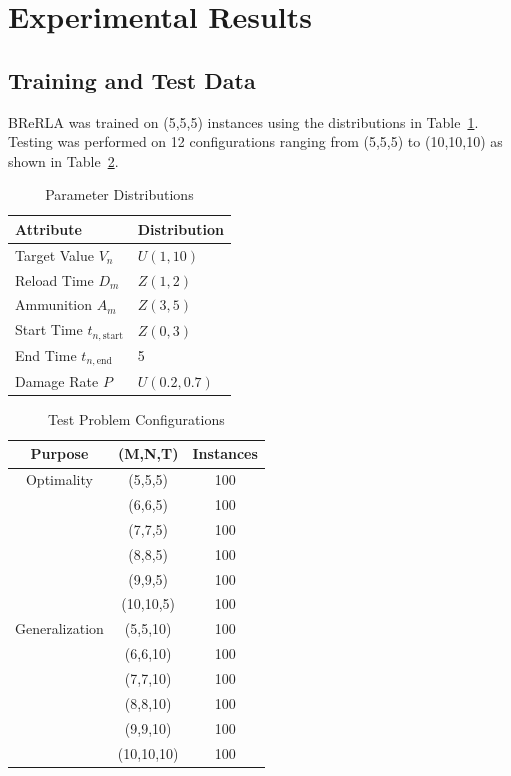 \documentclass{ieeeaccess}
\begin{document}
\section{Experimental Results}
\label{sec:results}

\subsection{Training and Test Data}

BReRLA was trained on (5,5,5) instances using the distributions in Table~\ref{tab:parameter_distributions}. Testing was performed on 12 configurations ranging from (5,5,5) to (10,10,10) as shown in Table~\ref{tab:problem_instance_scales}.

\begin{table}[htbp]
\centering
\small
\caption{Parameter Distributions}
\label{tab:parameter_distributions}
\begin{tabular}{l|l}
\hline
\textbf{Attribute} & \textbf{Distribution} \\ \hline
Target Value $V_n$ & $U(1, 10)$ \\
Reload Time $D_m$ & $Z(1, 2)$ \\
Ammunition $A_m$ & $Z(3, 5)$ \\
Start Time $t_{n,\text{start}}$ & $Z(0, 3)$ \\
End Time $t_{n,\text{end}}$ & 5 \\
Damage Rate $P$ & $U(0.2, 0.7)$ \\ \hline
\end{tabular}
\end{table}

\begin{table}[htbp]
\centering
\small
\caption{Test Problem Configurations}
\label{tab:problem_instance_scales}
\begin{tabular}{c|c|c}
\hline
\textbf{Purpose} & \textbf{(M,N,T)} & \textbf{Instances} \\ \hline
Optimality & (5,5,5) & 100 \\ \hline
\multirow{11}{*}{Generalization} & (6,6,5) & 100 \\
& (7,7,5) & 100 \\
& (8,8,5) & 100 \\
& (9,9,5) & 100 \\
& (10,10,5) & 100 \\
& (5,5,10) & 100 \\
& (6,6,10) & 100 \\
& (7,7,10) & 100 \\
& (8,8,10) & 100 \\
& (9,9,10) & 100 \\
& (10,10,10) & 100 \\ \hline
\end{tabular}
\end{table}
\end{document}
